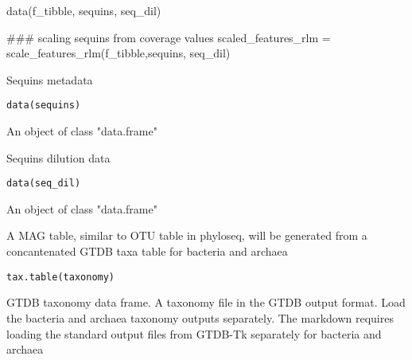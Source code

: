 \documentclass[a4paper]{book}
\begin{document}
%
\begin{Examples}
\begin{ExampleCode}
data(f_tibble, sequins, seq_dil)



### scaling sequins from coverage values
scaled_features_rlm = scale_features_rlm(f_tibble,sequins, seq_dil)


\end{ExampleCode}
\end{Examples}
%
\begin{Description}\relax
Sequins metadata
\end{Description}
%
\begin{Usage}
\begin{verbatim}
data(sequins)
\end{verbatim}
\end{Usage}
%
\begin{Format}
An object of class "data.frame"
\end{Format}
%
\begin{Description}\relax
Sequins dilution data
\end{Description}
%
\begin{Usage}
\begin{verbatim}
data(seq_dil)
\end{verbatim}
\end{Usage}
%
\begin{Format}
An object of class "data.frame"
\end{Format}
%
\begin{Description}\relax
A MAG table, similar to OTU table in phyloseq, will be generated from a
concantenated GTDB taxa table for bacteria and archaea
\end{Description}
%
\begin{Usage}
\begin{verbatim}
tax.table(taxonomy)
\end{verbatim}
\end{Usage}
%
\begin{Arguments}
\begin{ldescription}
\item[\code{taxonomy}] GTDB taxonomy data frame.  A taxonomy file in the GTDB output format. Load the bacteria and archaea taxonomy outputs separately.
The markdown requires loading the standard output files from GTDB-Tk separately for bacteria and archaea
\end{ldescription}
\end{Arguments}
\end{document}
